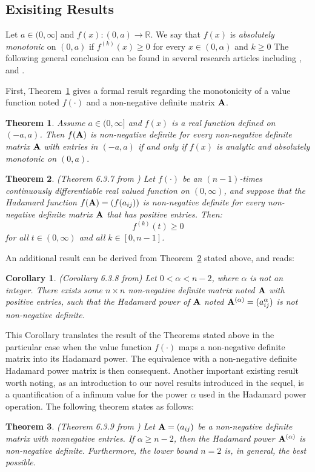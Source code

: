 \documentclass[conference,letterpaper]{IEEEtran}
\numberwithin{equation}{section}
\newcommand{\lbl}{\label}
\newcommand{\bd}{\bold}
\newtheorem{theorem}{{\sc Theorem}}[section]
\newtheorem{coro}{{\sc Corollary}}[section]
\begin{document}
\subsection{Exisiting Results}\lbl{known_results}

 Let $a \in (0, \infty]$ and $f(x): (0, a)\to \mathbb{R}$. 
 We say that $f(x)$ is {\it absolutely monotonic} on  $(0, a)$ if $f^{(k)}(x)\geq 0$ for every $x\in (0, \alpha)$ and $k\geq0$ 
 The following general conclusion can be found in several research articles including \cite{schoenberg1988positive},  \cite{vasudeva1979positive} and \cite{hiai2009monotonicity}.

First, Theorem~\ref{oldth1} gives a formal result regarding the monotonicity of a value function noted $f(\cdot)$ and a non-negative definite matrix $\bd{A}$.
\begin{theorem} \label{oldth1}
Assume $a \in (0, \infty]$ and $f(x)$ is a real function defined on $(-a, a)$.  
Then $f(\bd{A})$ is non-negative definite for every non-negative definite matrix  $\bd{A}$ with  entries in $(-a, a)$ if and only if $f(x)$ is analytic and absolutely monotonic on $(0, a).$
\end{theorem}


\begin{theorem}\label{oldth2} (Theorem 6.3.7 from \cite{horn_johnson_1991})
	Let $f(\cdot)$ be an $(n-1)$-times continuously differentiable real valued function on $(0,\infty)$, and suppose that the Hadamard function $f(\bd{A})=(f(a_{ij}))$ is non-negative definite for every non-negative definite matrix $\bd{A}$ that has positive entries. Then:
$$f^{(k)}(t)\geq 0$$
 for all $t\in(0,\infty)$ and all $k \in [0,n-1]$.
\end{theorem}
An additional result can be derived from Theorem~\ref{oldth2} stated above, and reads:
\begin{coro}(Corollary 6.3.8 from\cite{horn_johnson_1991})
	Let $0<\alpha<n-2$, where $\alpha$ is not an integer. 
	There exists some $n\times n$ non-negative definite matrix noted $\bd{A}$ with positive entries, such that the Hadamard power of  $\bd{A}$ noted $\bd{A}^{(\alpha)}=(a_{ij}^\alpha)$ is not non-negative definite.
\end{coro}
This Corollary translates the result of the Theorems stated above in the particular case when the value function $f(\cdot)$ maps a non-negative definite matrix into its Hadamard power. 
The equivalence with a non-negative definite Hadamard power matrix is then consequent.
Another important existing result worth noting, as an introduction to our novel results introduced in the sequel, is a quantification of a infimum value for the power $\alpha$ used in the Hadamard power operation. The following theorem states as follows:
\begin{theorem} (Theorem 6.3.9 from \cite{horn_johnson_1991})
	Let $\bd{A}=(a_{ij})$ be a non-negative definite matrix with nonnegative entries. If $\alpha \geq n-2$, then the Hadamard power $\bd{A}^{(\alpha)}$ is non-negative definite. Furthermore, the lower bound $n=2$ is, in general, the best possible.
\end{theorem}
\end{document}
